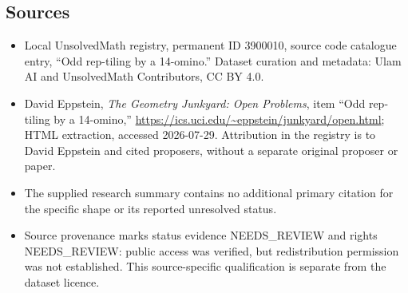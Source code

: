 \documentclass[11pt]{article}
\begin{document}
\subsection{Sources}
\begin{itemize}
\item Local UnsolvedMath registry, permanent ID 3900010, source code catalogue entry, ``Odd rep-tiling by a 14-omino.'' Dataset curation and metadata: Ulam AI and UnsolvedMath Contributors, CC BY 4.0.
\item David Eppstein, \emph{The Geometry Junkyard: Open Problems}, item ``Odd rep-tiling by a 14-omino,'' \url{https://ics.uci.edu/~eppstein/junkyard/open.html}; HTML extraction, accessed 2026-07-29. Attribution in the registry is to David Eppstein and cited proposers, without a separate original proposer or paper.
\item The supplied research summary contains no additional primary citation for the specific shape or its reported unresolved status.
\item Source provenance marks status evidence NEEDS\_REVIEW and rights NEEDS\_REVIEW: public access was verified, but redistribution permission was not established. This source-specific qualification is separate from the dataset licence.
\end{itemize}
\end{document}
